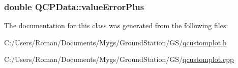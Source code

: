 \subsubsection[{value\+Error\+Plus}]{\setlength{\rightskip}{0pt plus 5cm}double Q\+C\+P\+Data\+::value\+Error\+Plus}\label{class_q_c_p_data_ad26912552d03485ea20d91dcad16aa8f}


The documentation for this class was generated from the following files\+:\begin{DoxyCompactItemize}
\item 
C\+:/\+Users/\+Roman/\+Documents/\+Mygs/\+Ground\+Station/\+G\+S/\hyperlink{qcustomplot_8h}{qcustomplot.\+h}\item 
C\+:/\+Users/\+Roman/\+Documents/\+Mygs/\+Ground\+Station/\+G\+S/\hyperlink{qcustomplot_8cpp}{qcustomplot.\+cpp}\end{DoxyCompactItemize}
